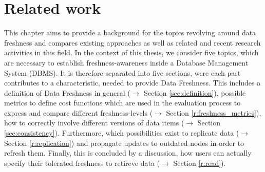 \chapter{Related work}
\label{c:related}



This chapter aims to provide a background for the topics revolving around data freshness and compares existing approaches 
as well as related and recent research activities in this field. 
In the context of this thesis, we consider five topics, which are necessary to establish 
freshness-awareness inside a Database Management System (DBMS).
It is therefore separated into five sections, were each part contributes to a characteristic, needed to 
provide Data Freshness. This includes a definition of Data Freshness in general ($\rightarrow$ Section \ref{sec:definition}), 
possible metrics to define cost functions which are used
in the evaluation process to express and compare different freshness-levels ($\rightarrow$ Section \ref{r:freshness_metrics}), 
how to correctly involve different versions of data items ($\rightarrow$ Section \ref{sec:consistency}). 
Furthermore, which possibilities exist to replicate data ($\rightarrow$ Section \ref{r:replication}) 
and propagate updates to outdated nodes in order to refresh them.
Finally, this is concluded by a discussion, how users can actually specify their tolerated freshness to retireve data ($\rightarrow$ Section \ref{r:read}).






